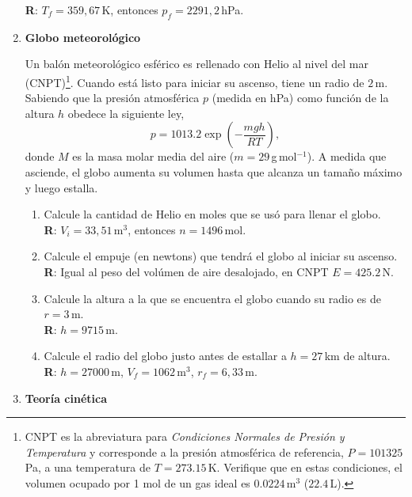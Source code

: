 \documentclass[a4paper,12pt]{article}
\begin{document}
\begin{enumerate}
		{\bf R}: $T_f = 359,67$\,K, entonces $p_f = 2291,2$\,hPa.
	\item {\bf{Globo meteorológico}}
		
		Un balón meteorológico esférico es rellenado con Helio al nivel del mar
		(CNPT)\footnote{CNPT es la abreviatura para {\textit{Condiciones
		Normales de Presión y Temperatura}} y corresponde a la presión
		atmosférica de referencia, $P=101325$\,Pa, a una temperatura de
		$T=273.15$\,K. Verifique que en estas condiciones, el volumen ocupado
		por 1 mol de un gas ideal es $0.0224$\,m$^3$ ($22.4$\,L).}.  Cuando
		está listo para iniciar su ascenso, tiene un radio de $2$\,m.  Sabiendo
		que la presión atmosférica $p$ (medida en hPa) como función de la
		altura $h$ obedece la siguiente ley, \[ p = 1013.2 \exp \left (
		-\frac{mgh}{RT} \right ),\] donde $M$ es la masa molar media del aire
		($m=29$\,g\,mol$^{-1}$). A medida que asciende, el globo aumenta su
		volumen hasta que alcanza un tamaño máximo y luego estalla. 
		\begin{enumerate}
			\item Calcule la cantidad de Helio en moles que se usó para llenar
				el globo.
				\\{\bf R}: $V_i=33,51$\,m$^3$, entonces $n=1496$\,mol.
			\item Calcule el empuje (en newtons) que tendrá el globo al iniciar
				su ascenso. 
				\\{\bf R}: Igual al peso del volúmen de aire desalojado, en
				CNPT $E=425.2$\,N.
			\item Calcule la altura a la que se encuentra el globo cuando su
				radio es de $r=3$\,m.
				\\{\bf R}: $h=9715$\,m.
			\item Calcule el radio del globo justo antes de estallar a
				$h=27$\,km de altura.
				\\{\bf R}: $h=27000$\,m, $V_f=1062$\,m$^3$, $r_f=6,33$\,m.
		\end{enumerate}

	\item {\bf{Teoría cinética}}


\end{enumerate}
\end{document}
